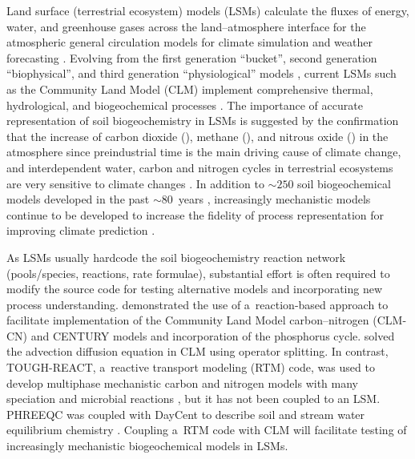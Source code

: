 \documentclass[gmd,noline]{copernicus}
\begin{document}
\introduction

      Land surface (terrestrial ecosystem) models (LSMs) calculate the
      fluxes of energy, water, and greenhouse gases across the
      land--atmosphere interface for the atmospheric general circulation
      models for climate simulation and weather forecasting
      \citep{Sellers1997}. Evolving from the first generation ``bucket'',
      second generation ``biophysical'', and third generation
      ``physiological'' models \citep{Seneviratne2010}, current LSMs such as
      the Community Land Model (CLM) implement comprehensive thermal,
      hydrological, and biogeochemical processes \citep{Oleson2013}. The
      importance of accurate representation of soil biogeochemistry in LSMs
      is suggested by the confirmation that the increase of carbon dioxide
      (), methane (), and nitrous oxide ()
      in the atmosphere since preindustrial time is the main driving cause
      of climate change, and interdependent water, carbon and nitrogen
      cycles in terrestrial ecosystems are very sensitive to climate changes
      \citep{IPCC2013}. In addition to $\sim 250$ soil biogeochemical models
      developed in the past $\sim 80$~years \citep{Manzoni2009},
      increasingly mechanistic models continue to be developed to increase
      the fidelity of process representation for improving climate
      prediction \citep[e.g.,][]{Riley2014}.

      As LSMs usually hardcode the soil biogeochemistry reaction network
      (pools/species, reactions, rate formulae), substantial effort is often
      required to modify the source code for testing alternative models and
      incorporating new process understanding. \citet{Fang2013} demonstrated
      the use of a~reaction-based approach to facilitate implementation of
      the Community Land Model carbon--nitrogen (CLM-CN) and CENTURY models and incorporation of the phosphorus
      cycle.  \citet{Tang2013b} solved the advection diffusion equation in
      CLM using operator splitting. In contrast, TOUGH-REACT, a~reactive
      transport modeling (RTM) code, was used to develop multiphase
      mechanistic carbon and nitrogen models with many speciation and
      microbial reactions \citep{Maggi2008,Gu2010,Riley2014}, but it has not
      been coupled to an LSM. PHREEQC was coupled with DayCent to describe
      soil and stream water equilibrium chemistry
      \citep{Hartman2007}. Coupling a~RTM code with CLM will facilitate
      testing of increasingly mechanistic biogeochemical models in LSMs.
\end{document}

